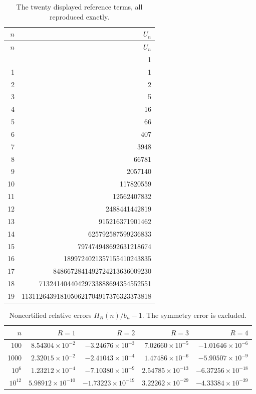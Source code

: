 \begin{longtable}{r r}
\caption{The twenty displayed reference terms, all reproduced exactly.}\label{tab:exact}\\
\toprule $n$ & $U_n$ \\ \midrule
\endfirsthead
\toprule $n$ & $U_n$ \\ \midrule
\endhead
\bottomrule\endfoot
0 & 1 \\
1 & 1 \\
2 & 2 \\
3 & 5 \\
4 & 16 \\
5 & 66 \\
6 & 407 \\
7 & 3948 \\
8 & 66781 \\
9 & 2057140 \\
10 & 117820559 \\
11 & 12562407832 \\
12 & 2488441442819 \\
13 & 915216371901462 \\
14 & 625792587599236833 \\
15 & 797474948692631218674 \\
16 & 1899724021357155410243835 \\
17 & 8486672841492724213636009230 \\
18 & 71324140440429733888694354552551 \\
19 & 1131126439181050621704917376323373818 \\
\end{longtable}
\begin{table}[htbp]\centering\small
\caption{Noncertified relative errors $H_R(n)/b_n-1$. The symmetry error is excluded.}\label{tab:orders}
\begin{tabular}{r r r r r}\toprule
$n$ & $R=1$ & $R=2$ & $R=3$ & $R=4$ \\ \midrule
100 & $8.54304\times10^{-2}$ & $-3.24676\times10^{-3}$ & $7.02660\times10^{-5}$ & $-1.01646\times10^{-6}$ \\
1000 & $2.32015\times10^{-2}$ & $-2.41043\times10^{-4}$ & $1.47486\times10^{-6}$ & $-5.90507\times10^{-9}$ \\
$10^6$ & $1.23212\times10^{-4}$ & $-7.10380\times10^{-9}$ & $2.54785\times10^{-13}$ & $-6.37256\times10^{-18}$ \\
$10^{12}$ & $5.98912\times10^{-10}$ & $-1.73223\times10^{-19}$ & $3.22262\times10^{-29}$ & $-4.33384\times10^{-39}$ \\
\bottomrule\end{tabular}\end{table}
